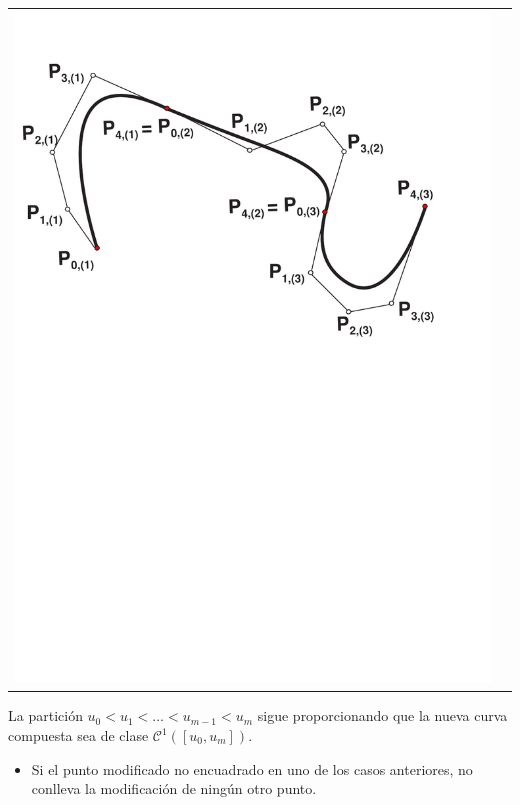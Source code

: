 \documentclass[ebook,oneside]{memoir}
\begin{document}
\begin{center}
\begin{tabular}{cc}
\includegraphics[scale=0.45]{3_23b.pdf}
\end{tabular}
\end{center}

La partici\'{o}n $u_0<u_1<\ldots<u_{m-1}<u_m$ sigue proporcionando que la nueva curva compuesta sea de clase ${\mathcal  C}^1([u_0,u_m]).$

\begin{itemize}
\item Si el punto modificado no encuadrado en uno de los casos anteriores, no conlleva la modificaci\'{o}n de ning\'{u}n otro punto.
\end{itemize}
\end{document}
